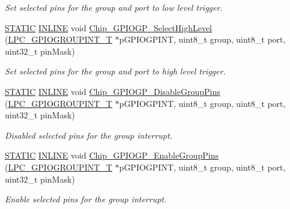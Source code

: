\begin{DoxyCompactItemize}
\begin{DoxyCompactList}\small\item\em Set selected pins for the group and port to low level trigger. \end{DoxyCompactList}\item 
\hyperlink{group___l_p_c___types___public___macros_ga10b2d890d871e1489bb02b7e70d9bdfb}{S\+T\+A\+T\+IC} \hyperlink{spifi__18xx__43xx_8h_a2eb6f9e0395b47b8d5e3eeae4fe0c116}{I\+N\+L\+I\+NE} void \hyperlink{group___g_p_i_o_g_p__18_x_x__43_x_x_ga8d2f30138917327117d2cecb9c1c50fb}{Chip\+\_\+\+G\+P\+I\+O\+G\+P\+\_\+\+Select\+High\+Level} (\hyperlink{struct_l_p_c___g_p_i_o_g_r_o_u_p_i_n_t___t}{L\+P\+C\+\_\+\+G\+P\+I\+O\+G\+R\+O\+U\+P\+I\+N\+T\+\_\+T} $\ast$p\+G\+P\+I\+O\+G\+P\+I\+NT, uint8\+\_\+t group, uint8\+\_\+t port, uint32\+\_\+t pin\+Mask)
\begin{DoxyCompactList}\small\item\em Set selected pins for the group and port to high level trigger. \end{DoxyCompactList}\item 
\hyperlink{group___l_p_c___types___public___macros_ga10b2d890d871e1489bb02b7e70d9bdfb}{S\+T\+A\+T\+IC} \hyperlink{spifi__18xx__43xx_8h_a2eb6f9e0395b47b8d5e3eeae4fe0c116}{I\+N\+L\+I\+NE} void \hyperlink{group___g_p_i_o_g_p__18_x_x__43_x_x_gac23132a059cba44f07718b6d3fe38a3f}{Chip\+\_\+\+G\+P\+I\+O\+G\+P\+\_\+\+Disable\+Group\+Pins} (\hyperlink{struct_l_p_c___g_p_i_o_g_r_o_u_p_i_n_t___t}{L\+P\+C\+\_\+\+G\+P\+I\+O\+G\+R\+O\+U\+P\+I\+N\+T\+\_\+T} $\ast$p\+G\+P\+I\+O\+G\+P\+I\+NT, uint8\+\_\+t group, uint8\+\_\+t port, uint32\+\_\+t pin\+Mask)
\begin{DoxyCompactList}\small\item\em Disabled selected pins for the group interrupt. \end{DoxyCompactList}\item 
\hyperlink{group___l_p_c___types___public___macros_ga10b2d890d871e1489bb02b7e70d9bdfb}{S\+T\+A\+T\+IC} \hyperlink{spifi__18xx__43xx_8h_a2eb6f9e0395b47b8d5e3eeae4fe0c116}{I\+N\+L\+I\+NE} void \hyperlink{group___g_p_i_o_g_p__18_x_x__43_x_x_ga177072f557d0b74c6a1ab6d7f11674c7}{Chip\+\_\+\+G\+P\+I\+O\+G\+P\+\_\+\+Enable\+Group\+Pins} (\hyperlink{struct_l_p_c___g_p_i_o_g_r_o_u_p_i_n_t___t}{L\+P\+C\+\_\+\+G\+P\+I\+O\+G\+R\+O\+U\+P\+I\+N\+T\+\_\+T} $\ast$p\+G\+P\+I\+O\+G\+P\+I\+NT, uint8\+\_\+t group, uint8\+\_\+t port, uint32\+\_\+t pin\+Mask)
\begin{DoxyCompactList}\small\item\em Enable selected pins for the group interrupt. \end{DoxyCompactList}\end{DoxyCompactItemize}



